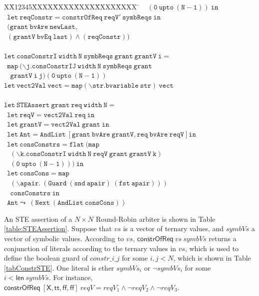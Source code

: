 \documentclass[final]{IEEEtran}
\newlength{\fminilength}
\newenvironment{fmini}[1][\linewidth]
  {\setlength{\fminilength}{#1\fboxsep-2\fboxrule}%
   \vspace{2ex}\noindent\begin{lrbox}{\fminibox}\begin{minipage}{\fminilength}%
   \mbox{ }\hfill\vspace{-2.5ex}}%
  {\end{minipage}\end{lrbox}\vspace{1ex}\hspace{0ex}%
   \framebox{\usebox{\fminibox}}}
\newenvironment{specification}
{\noindent\footnotesize\tt\begin{fmini}\begin{tabbing}X\=X12345\=XXXX\=XXXX\=XXXX\=XXXX\=XXXX
\=\+\kill} {\end{tabbing}\normalfont\end{fmini}}
\begin{document}
\begin{table}
\begin{specification}
   $\mathtt{ \ \  \ \                       (0\ upto\ (N - 1)) \ in}$\\
    $\mathtt{\ \  let\  reqConstr=constrOfReq\ reqV'\ symbReqs\
    in}$\\

  $\mathtt{\ \    (grant\ bvAre\ newLast,}$\\
    $\mathtt{\ \    (grantV\ bvEq\ last)  \wedge  (reqConstr))}$\\


\\


$\mathtt{let\  consConstrI\ width\ N\ symbReqs\ grant\
grantV\ i=}$ \\
 $\mathtt{\ \    map\  (\backslash  j. consConstrIJ\ width\ N\ symbReqs\ grant}$\\
 $\mathtt{\ \  \ \   grantV\ i\ j)  (0\
 upto\
 (N
- 1))}$\\

$\mathtt{let\  vect2Val\ vect = map (\backslash str. bvariable\ str)\ vect}$\\

\\

$\mathtt{let\  STEAssert\ grant\ req\ width\ N =}$\\
  $\mathtt{\ \    let\  reqV=vect2Val\ req\ in}$\\
  $\mathtt{\ \    let\  grantV=vect2Val\ grant\ in}$\\
   $\mathtt{\ \   let\  Ant=AndList\ [grant\ bvAre\ grantV, req\ bvAre\ reqV ]
   in}$\\
   $\mathtt{\ \   let\  consConstrs=flat\ ( map\ }$\\
   $\mathtt{\ \ \ \ (\backslash k. consConstrI\ width\ N \ reqV\ grant\ grantV\
   k)}$\\
  $\mathtt{\ \ \ \  (0 \ upto\ (N - 1)))\ in}$\\
  $\mathtt{\ \    let\  consCons=map\ }$\\
  $\mathtt{\ \ \ \ (\backslash apair. \ (Guard \ (snd\ apair)\ (fst\
  apair)))}$\\
   $\mathtt{\ \ \ \ consConstrs\
  in}$\\
  $\mathtt{\ \     Ant\leadsto\ (Next\ (AndList\ consCons))}$
\end{specification}
\end{table}
 An STE assertion of a $N \times N$ Round-Robin arbiter  is shown in Table \ref{table:STEAssertion}.  Suppose that $vs$ is a vector of ternary values, and
$ symbVs$ a vector of symbolic values. According to $vs$,
$\mathsf{constrOfReq}\ vs\ symbVs$ returns a conjunction of literals
according to the ternary values in $vs$, which is used to define the
boolean guard of $constr\_i\_j$ for some $i,j<N$, which is shown in
Table \ref{tabConstrSTE}. One literal is ether $symbVs_i$ or $\neg symbVs_i$ for some $i<\mathsf{len}\ symbVs$. For instance,
$\mathsf{constrOfReq}\ [\mathsf{X},
\mathsf{tt},\mathsf{ff},\mathsf{ff}]\ reqV = reqV_1\wedge \neg
reqV_2\wedge \neg reqV_3$.
\end{document}
